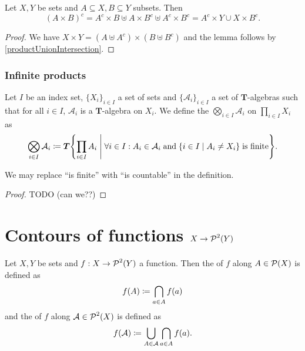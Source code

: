 \begin{lemma}
Let $X,Y$ be sets and $A\subseteq X, B\subseteq Y$ subsets. Then
\[ (A\times B)^c = A^c\times B \uplus A\times B^c \uplus A^c\times B^c = A^c\times Y \cup X\times B^c. \]
\end{lemma}
\begin{proof}
We have $X\times Y = (A\uplus A^c)\times (B\uplus B^c)$ and the lemma follows by \ref{productUnionIntersection}.
\end{proof}

\subsubsection{Infinite products}
\begin{definition}
Let $I$ be an index set, $\{X_i\}_{i\in I}$ a set of sets and $\{\mathcal{A}_i\}_{i\in I}$ a set of $\boldsymbol{T}$-algebras such that for all $i\in I$, $\mathcal{A}_i$ is a $\boldsymbol{T}$-algebra on $X_i$. We define the  $\bigotimes_{i\in I}\mathcal{A}_i$ on $\prod_{i\in I}X_i$ as
\[ \bigotimes_{i\in I}\mathcal{A}_i \defeq \boldsymbol{T}\setbuilder{\prod_{i\in I}A_i}{\forall i\in I: A_i\in\mathcal{A}_i\; \text{and}\; \setbuilder{i\in I}{A_i\neq X_i}\;\text{is finite}}. \]
\end{definition}

\begin{proposition}
We may replace ``is finite'' with ``is countable'' in the definition.
\end{proposition}
\begin{proof}
TODO (can we??)
\end{proof}

\section{Contours of functions $X\to \operatorname{\mathcal{P}}^2(Y)$}
\begin{definition}
Let $X,Y$ be sets and $f: X\to \operatorname{\mathcal{P}}^2(Y)$ a function. Then the  of $f$ along $A\in \operatorname{\mathcal{P}}(X)$ is defined as
\[ f(A) \coloneqq \bigcap_{a\in A} f(a) \]
and the  of $f$ along $\mathcal{A}\in\operatorname{\mathcal{P}}^2(X)$ is defined as
\[ f(\mathcal{A}) \coloneqq \bigcup_{A\in\mathcal{A}}\bigcap_{a\in A} f(a). \]
\end{definition}


